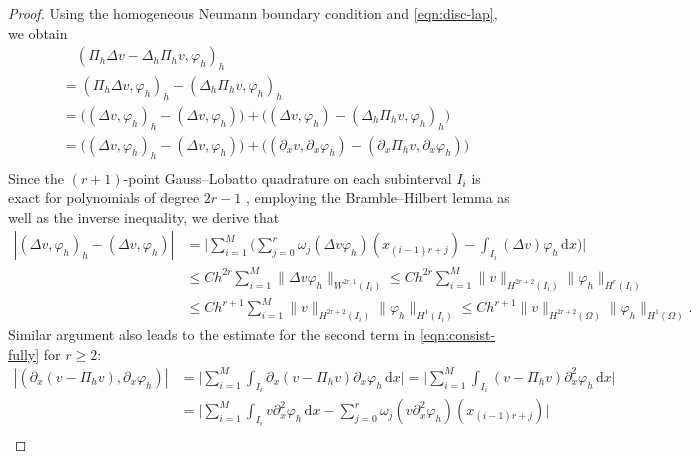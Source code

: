 \documentclass[10pt,final,leqno,onefignum,onetabnum]{siamltex}%
\def\d{\textrm{d}}
\def\d{\mathrm{d}}
\def\II{(\Omega)}
\def\fy{\varphi}
\begin{document}
\begin{proof}
Using the homogeneous Neumann boundary condition
and  \eqref{eqn:disc-lap}, we obtain
\begin{equation}\label{eqn:consist-fully}
\begin{aligned}
  &\quad(\Pi_h \Delta v - \Delta_h \Pi_h v, \fy_h )_h \\
  &= (\Pi_h \Delta v , \fy_h )_h -  (\Delta_h \Pi_h v, \fy_h )_h\\
  &= \Big(( \Delta v , \fy_h )_h - ( \Delta v , \fy_h )\Big) +  \Big(( \Delta v , \fy_h ) -  (\Delta_h \Pi_h v, \fy_h )_h\Big)\\
    &= \Big(( \Delta v , \fy_h )_h - ( \Delta v , \fy_h )\Big) +  \Big(( \partial_x v , \partial_x \fy_h ) -  (\partial_x \Pi_h v, \partial_x \fy_h )\Big)\\
\end{aligned}
\end{equation}
Since the $(r + 1)$-point Gauss--Lobatto quadrature on each subinterval $I_i$ is exact for polynomials of degree
$2r - 1$ \cite[pp. 425]{Quarteroni:2000}, employing the Bramble--Hilbert lemma
as well as the inverse inequality, we derive that
\begin{align*}
|( \Delta v , \fy_h )_h - ( \Delta v , \fy_h ) | &= \Big|\sum_{i=1}^M \Big(\sum_{j=0}^{r} \omega_j  (\Delta v   \fy_h)(x_{(i-1)r+j}) - \int_{I_i} (\Delta v ) \fy_h \,\d x\Big) \Big|\\
&\le C h^{2r} \sum_{i=1}^M \| \Delta v   \fy_h  \|_{W^{2r,1}(I_i)} \le  C h^{2r} \sum_{i=1}^M \|   v  \|_{H^{2r+2}(I_i)}  \| \fy_h  \|_{H^{r}(I_i)}\\
&\le Ch^{r+1} \sum_{i=1}^M \|   v  \|_{H^{2r+2}(I_i)}  \| \fy_h  \|_{H^{1}(I_i)} \le Ch^{r+1}  \|   v  \|_{H^{2r+2}\II}  \| \fy_h  \|_{H^{1}\II}.
\end{align*}
Similar argument also leads to the estimate for the second term in \eqref{eqn:consist-fully} for $r\ge2$:
\begin{align*}
 |( \partial_x (v- \Pi_h v), \partial_x \fy_h )|
 &= \Big|\sum_{i=1}^M \int_{I_i}  \partial_x (v- \Pi_h v) \partial_x \fy_h \,\d x\Big|
 =\Big|\sum_{i=1}^M \int_{I_i}    (v- \Pi_h v) \partial_x^2 \fy_h \,\d x\Big|\\
& =\Big|\sum_{i=1}^M \int_{I_i}    v  \partial_x^2 \fy_h \,\d x - \sum_{j=0}^{r} \omega_j  (  v  \partial_x^2 \fy_h)(x_{(i-1)r+j}) \Big|\\

\end{align*}
\end{proof}
\end{document}
